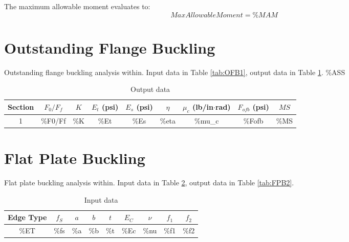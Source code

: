 \documentclass[11pt]{article}
\begin{document}
The maximum allowable moment evaluates to: \[Max Allowable Moment={\%MAM}\]
\clearpage
\section{Outstanding Flange Buckling}

Outstanding flange buckling analysis within. Input data in Table \ref{tab:OFB1}, output data in Table \ref{tab:OFB2}. {\%ASS}

\begin{table}[h]
    \centering
	\caption{Input data}
	\label{tab:OFB1}
\end{table}


\begin{table}[h]
    \centering
    \begin{tabular}{|c|cccccc|cc|}
      \hline \textbf{Section} & \textbf{$F_0/F_f$} & \textbf{$K$} & \textbf{$E_t$ (psi)} & \textbf{$E_s$ (psi)} & \textbf{$\eta$} & \textbf{$\mu_c$ (lb/in$\cdot$rad)} & \textbf{$F_{ofb}$ (psi)} & \textbf{$MS$}\\\hline
      1 & {\%F0/Ff} & {\%K} & {\%Et} & {\%Es} & {\%eta} & {\%mu\_c} & {\%Fofb} & {\%MS}\\\hline
    \end{tabular}
	\caption{Output data}
	\label{tab:OFB2}
\end{table}

\clearpage
\section{Flat Plate Buckling}

Flat plate buckling analysis within. Input data in Table \ref{tab:FPB1}, output data in Table \ref{tab:FPB2}.

\begin{table}[h]
    \centering
    \begin{tabular}{|c|c|c|c|c|c|c|c|c|}
      \hline \textbf{Edge Type} & $f_S$ & $a$ & $b$ & $t$ & $E_C$ & $\nu$ & $f_1$ & $f_2$\\\hline
      {\%ET} & {\%fs} & {\%a} & {\%b} & {\%t} & {\%Ec} & {\%nu} & {\%f1} & {\%f2}\\\hline
    \end{tabular}
	\caption{Input data}
	\label{tab:FPB1}
\end{table}
\end{document}
